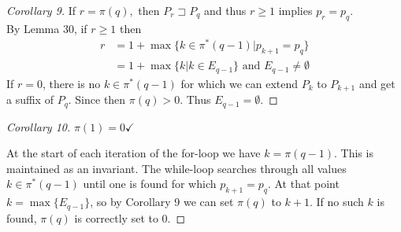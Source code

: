 \documentclass[12pt,oneside,a4paper,parskip=on,fleqn]{scrartcl}
\begin{document}
\begin{proof}[Corollary 9]
	If $r=\pi(q),$ then $P_r \sqsupset P_q$ and thus $r\geq 1$ implies $p_r=p_q$.\\
	By Lemma 30, if $r\geq 1$ then \begin{align*}r&=1+\max\bigl\{ k\in \pi^*(q-1) | p_{k+1} = p_q \bigr\}\\
	&= 1+\max\bigl\{ k|k\in E_{q-1} \bigr\} \text{ and } E_{q-1} \neq \emptyset
	\end{align*}
	If $r=0$, there is no $k\in \pi^*(q-1)$ for which we can extend $P_k$ to $P_{k+1}$ and get a suffix of $P_q$. Since then $\pi(q) > 0$. Thus $E_{q-1} = \emptyset$.
\end{proof}

\begin{proof}[Corollary 10]
	$\pi(1) = 0\checkmark$

	At the start of each iteration of the for-loop we have $k=\pi(q-1)$. This is maintained as an invariant. The while-loop searches through all values $k\in \pi^*(q-1)$ until one is found for which $p_{k+1} = p_q$. At that point $k=\max \{E_{q-1}\}$, so by Corollary 9 we can set $\pi(q)$ to $k+1$. If no such $k$ is found, $\pi(q)$ is correctly set to $0$.
\end{proof}
\end{document}
